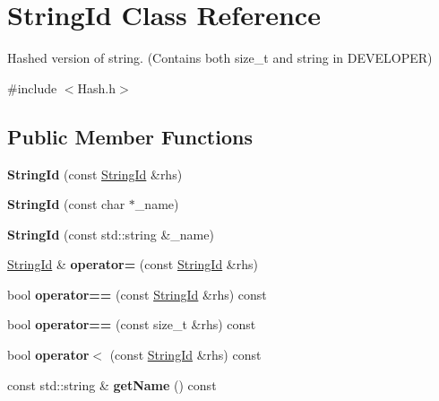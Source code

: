 \hypertarget{classStringId}{}\section{String\+Id Class Reference}
\label{classStringId}


Hashed version of string. (Contains both size\+\_\+t and string in D\+E\+V\+E\+L\+O\+P\+ER)  




{\ttfamily \#include $<$Hash.\+h$>$}

\subsection*{Public Member Functions}
\begin{DoxyCompactItemize}
\item 
\mbox{\label{classStringId_a5ebe48c57cba18ecb0a4d6138c940912}} 
{\bfseries String\+Id} (const \hyperlink{classStringId}{String\+Id} \&rhs)
\item 
\mbox{\label{classStringId_ac36858794aec71cd267a2dd4c04f62cc}} 
{\bfseries String\+Id} (const char $\ast$\+\_\+name)
\item 
\mbox{\label{classStringId_ab4970259f494987b5b8bbdd80aa631a1}} 
{\bfseries String\+Id} (const std\+::string \&\+\_\+name)
\item 
\mbox{\label{classStringId_ae03d49a9de8cee37df7556df6add8c67}} 
\hyperlink{classStringId}{String\+Id} \& {\bfseries operator=} (const \hyperlink{classStringId}{String\+Id} \&rhs)
\item 
\mbox{\label{classStringId_abfc0180fd473b254d53e26db1d1b9c29}} 
bool {\bfseries operator==} (const \hyperlink{classStringId}{String\+Id} \&rhs) const
\item 
\mbox{\label{classStringId_a6600931716179f845c8713160ae815b7}} 
bool {\bfseries operator==} (const size\+\_\+t \&rhs) const
\item 
\mbox{\label{classStringId_a02424f3ac696147e3604d642c49cac21}} 
bool {\bfseries operator$<$} (const \hyperlink{classStringId}{String\+Id} \&rhs) const
\item 
\mbox{\label{classStringId_ae21b625f9c8ae397e770ac670443c87b}} 
const std\+::string \& {\bfseries get\+Name} () const
\end{DoxyCompactItemize}
